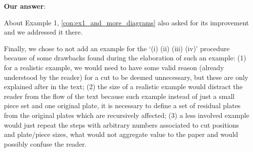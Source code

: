 \documentclass[smallextended]{svjour3}       %
\makeatletter
\newcommand\gobblepars{%
    \@ifnextchar\par%
        {\expandafter\gobblepars\@gobble}%
        {}}
\newcounter{answer}
\newenvironment{answer}{%
    \refstepcounter{answer}\par\smallskip\noindent%
    \textbf{Our answer}: \gobblepars}%
    {\unskip\bigskip}
\makeatother
\begin{document}
\begin{answer}
About Example 1, \autoref{con:ex1_and_more_diagrams} also asked for its improvement and we addressed it there.

Finally, we chose to not add an example for the `(i) (ii) (iii) (iv)' procedure because of some drawbacks found during the elaboration of such an example: (1) for a realistic example, we would need to have some valid reason (already understood by the reader) for a cut to be deemed unnecessary, but these are only explained after in the text; (2) the size of a realistic example would distract the reader from the flow of the text because such example instead of just a small piece set and one original plate, it is necessary to define a set of residual plates from the original plates which are recursively affected; (3) a less involved example would just repeat the steps with arbitrary numbers associated to cut positions and plate/piece sizes, what would not aggregate value to the paper and would possibly confuse the reader.
\end{answer}
\end{document}
